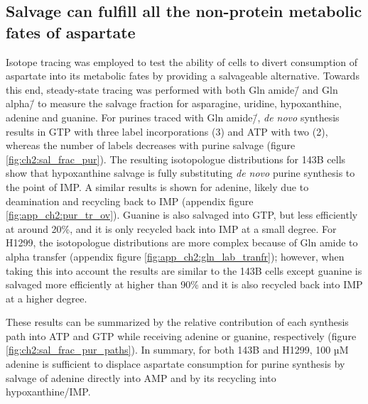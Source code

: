 \subsection{Salvage can fulfill all the non-protein metabolic fates of aspartate}
Isotope tracing was employed to test the ability of cells to divert consumption of aspartate into its metabolic fates by providing a salvageable alternative.
Towards this end, steady-state tracing was performed with both Gln amide\=/\hNi{} and Gln alpha\=/\hNi{} to measure the salvage fraction for asparagine, uridine, hypoxanthine, adenine and guanine.
For purines traced with Gln amide\=/\hNi{}, \textit{de novo} synthesis results in GTP with three label incorporations (\hNi{}3) and ATP with two (\hNi{}2), whereas the number of labels decreases with purine salvage (figure \ref{fig:ch2:sal_frac_pur}).
The resulting isotopologue distributions for 143B cells show that hypoxanthine salvage is fully substituting \textit{de novo} purine synthesis to the point of IMP.
A similar results is shown for adenine, likely due to deamination and recycling back to IMP (appendix figure \ref{fig:app_ch2:pur_tr_ov}).
Guanine is also salvaged into GTP, but less efficiently at around 20\%, and it is only recycled back into IMP at a small degree.
For H1299, the isotopologue distributions are more complex because of Gln amide to alpha \hNi{} transfer (appendix figure \ref{fig:app_ch2:gln_lab_tranfr}); however, when taking this into account the results are similar to the 143B cells except guanine is salvaged more efficiently at higher than 90\% and it is also recycled back into IMP at a higher degree.

These results can be summarized by the relative contribution of each synthesis path into ATP and GTP while receiving adenine or guanine, respectively (figure \ref{fig:ch2:sal_frac_pur_paths}).
In summary, for both 143B and H1299, 100 µM adenine is sufficient to displace aspartate consumption for purine synthesis by salvage of adenine directly into AMP and by its recycling into hypoxanthine/IMP.

